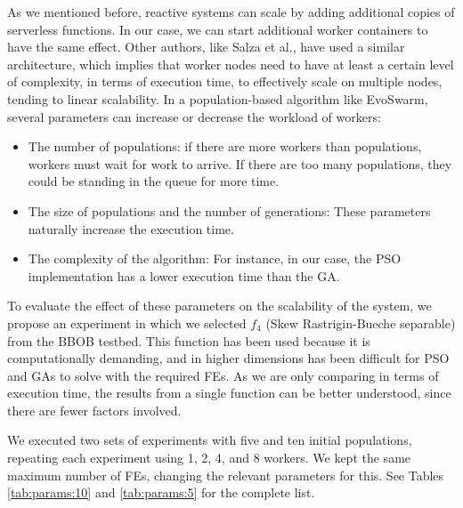 \documentclass[review]{elsarticle}
\begin{document}
As we mentioned before, reactive systems can scale by adding additional copies
of serverless functions. In our case, we can start additional worker containers
to have the same effect. Other authors, like Salza et al., %
have used a
similar architecture, which implies that worker nodes need to have at least a certain level
of complexity, in terms of execution time,  to effectively scale on multiple
nodes, tending to linear scalability. In a population-based algorithm like
EvoSwarm, several parameters can increase or decrease the workload of workers:

\begin{itemize}
    \item The number of populations: if there are more workers than populations, workers
    must wait for work to arrive. If there are too many populations, they could be
    standing in the queue for more time.
    \item The size of populations and the number of generations:
    These parameters naturally increase the execution time.
    \item The complexity of the algorithm: For instance, in our case,
    the PSO implementation has a lower execution time than the GA.
\end{itemize}

To evaluate the effect of these parameters on the scalability of the system, we
propose  an experiment in which we selected $f_4$ (Skew Rastrigin-Bueche separable) from the
BBOB testbed. This function has been used because it is computationally demanding,
and in higher dimensions has been difficult for PSO \cite{el2009black} and GAs
\cite{nicolau2009application} to solve with the required FEs. As we
are only comparing in terms of execution time, the results from a single function
can be better understood, since there are fewer factors involved. 

We executed two sets of experiments with five and ten initial populations,
repeating each experiment using  1, 2, 4, and 8 workers.  We kept the same
maximum number of FEs, changing the relevant parameters for this. 
See Tables \ref{tab:params:10} and \ref{tab:params:5} 
for the complete list. 
\end{document}

